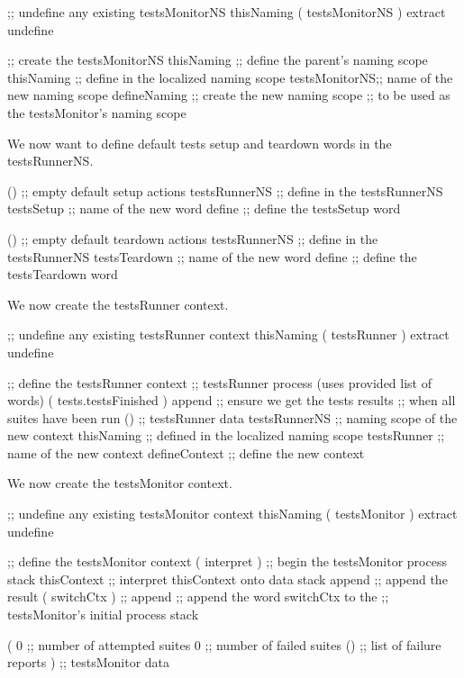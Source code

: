 \startJoylolCode
  ;; undefine any existing testsMonitorNS
  thisNaming
  ( testsMonitorNS ) extract
  undefine
  
  ;; create the testsMonitorNS
  thisNaming    ;; define the parent's naming scope
  thisNaming    ;; define in the localized naming scope
  testsMonitorNS;; name of the new naming scope
  defineNaming  ;; create the new naming scope
                ;; to be used as the testsMonitor's naming scope
\stopJoylolCode

We now want to define default tests setup and teardown words in the 
testsRunnerNS. 

\startJoylolCode
  ()            ;; empty default setup actions
  testsRunnerNS ;; define in the testsRunnerNS
  testsSetup    ;; name of the new word
  define        ;; define the testsSetup word
\stopJoylolCode

\startJoylolCode
  ()            ;; empty default teardown actions
  testsRunnerNS ;; define in the testsRunnerNS
  testsTeardown ;; name of the new word
  define        ;; define the testsTeardown word
\stopJoylolCode

We now create the testsRunner context.

\startJoylolCode
  ;; undefine any existing testsRunner context
  thisNaming
  ( testsRunner ) extract
  undefine

  ;; define the testsRunner context
                ;; testsRunner process (uses provided list of words)
  ( tests.testsFinished )
  append        ;; ensure we get the tests results
                ;; when all suites have been run
  ()            ;; testsRunner data
  testsRunnerNS ;; naming scope of the new context
  thisNaming    ;; defined in the localized naming scope
  testsRunner   ;; name of the new context
  defineContext ;; define the new context
\stopJoylolCode

We now create the testsMonitor context.

\startJoylolCode
  ;; undefine any existing testsMonitor context
  thisNaming
  ( testsMonitor ) extract
  undefine

  ;; define the testsMonitor context
  ( interpret )   ;; begin the testsMonitor process stack
  thisContext     ;; interpret thisContext onto data stack
  append          ;; append the result
  ( switchCtx )   ;;
  append          ;; append the word switchCtx to the
                  ;; testsMonitor's initial process stack
  
  (
    0             ;; number of attempted suites
    0             ;; number of failed suites
    ()            ;; list of failure reports
  )               ;; testsMonitor data
  

